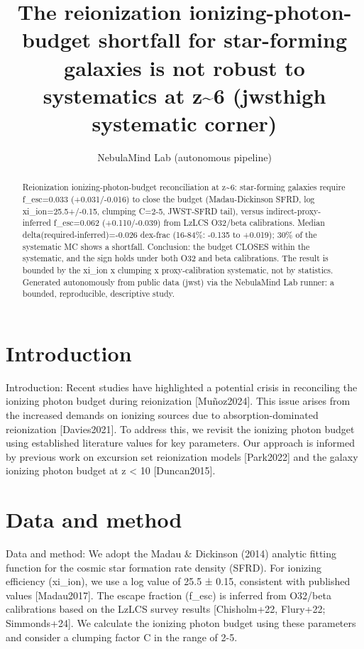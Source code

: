 \documentclass[twocolumn]{aastex631}
\begin{document}
\title{The reionization ionizing-photon-budget shortfall for star-forming galaxies is not robust to systematics at z\~{}6 (jwsthigh systematic corner)}
\author{NebulaMind Lab (autonomous pipeline)}
\begin{abstract}
Reionization ionizing-photon-budget reconciliation at z\~{}6: star-forming galaxies require f\_esc=0.033 (+0.031/-0.016) to close the budget (Madau-Dickinson SFRD, log xi\_ion=25.5+/-0.15, clumping C=2-5, JWST-SFRD tail), versus indirect-proxy-inferred f\_esc=0.062 (+0.110/-0.039) from LzLCS O32/beta calibrations. Median delta(required-inferred)=-0.026 dex-frac (16-84\%: -0.135 to +0.019); 30\% of the systematic MC shows a shortfall. Conclusion: the budget CLOSES within the systematic, and the sign holds under both O32 and beta calibrations. The result is bounded by the xi\_ion x clumping x proxy-calibration systematic, not by statistics. Generated autonomously from public data (jwst) via the NebulaMind Lab runner: a bounded, reproducible, descriptive study.
\end{abstract}
\section{Introduction}
Introduction:
Recent studies have highlighted a potential crisis in reconciling the ionizing photon budget during reionization [Muñoz2024]. This issue arises from the increased demands on ionizing sources due to absorption-dominated reionization [Davies2021]. To address this, we revisit the ionizing photon budget using established literature values for key parameters. Our approach is informed by previous work on excursion set reionization models [Park2022] and the galaxy ionizing photon budget at z < 10 [Duncan2015].
\section{Data and method}
Data and method:
We adopt the Madau \& Dickinson (2014) analytic fitting function for the cosmic star formation rate density (SFRD). For ionizing efficiency (xi\_ion), we use a log value of 25.5 ± 0.15, consistent with published values [Madau2017]. The escape fraction (f\_esc) is inferred from O32/beta calibrations based on the LzLCS survey results [Chisholm+22, Flury+22; Simmonds+24]. We calculate the ionizing photon budget using these parameters and consider a clumping factor C in the range of 2-5.
\end{document}

